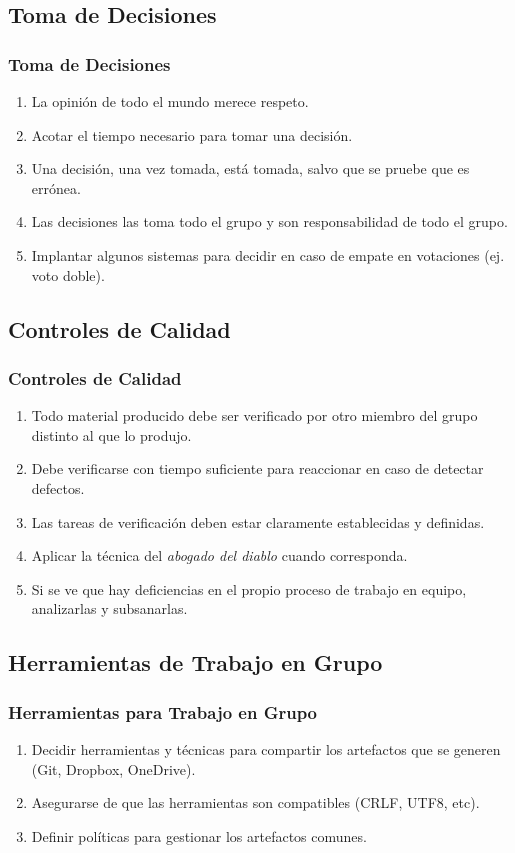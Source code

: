 \documentclass[handout,a4paper,slidestop,xcolor=pst,dvips,blue]{beamer}
\begin{document}
\subsection{Toma de Decisiones}

\begin{frame}[c]
	\frametitle{Toma de Decisiones}
	\begin{enumerate}[<+->]
		\item La opinión de todo el mundo merece respeto.
		\item Acotar el tiempo necesario para tomar una decisión.
		\item Una decisión, una vez tomada, está tomada, salvo que se pruebe que es errónea.
		\item Las decisiones las toma todo el grupo y son responsabilidad de todo el grupo.
		\item Implantar algunos sistemas para decidir en caso de empate en votaciones (ej. voto doble).
	\end{enumerate}
\end{frame}

\subsection{Controles de Calidad}

\begin{frame}[c]
	\frametitle{Controles de Calidad}
	\begin{enumerate}[<+->]
		\item Todo material producido debe ser verificado por otro miembro del grupo distinto al que lo produjo.
		\item Debe verificarse con tiempo suficiente para reaccionar en caso de detectar defectos.
		\item Las tareas de verificación deben estar claramente establecidas y definidas.
		\item Aplicar la técnica del \emph{abogado del diablo} cuando corresponda.
		\item Si se ve que hay deficiencias en el propio proceso de trabajo en equipo, analizarlas y subsanarlas.
	\end{enumerate}
\end{frame}

\subsection{Herramientas de Trabajo en Grupo}

\begin{frame}[c]
	\frametitle{Herramientas para Trabajo en Grupo}
	\begin{enumerate}[<+->]
		\item Decidir herramientas y técnicas para compartir los artefactos que se generen (Git, Dropbox, OneDrive).
		\item Asegurarse de que las herramientas son compatibles (CRLF, UTF8, etc).
		\item Definir políticas para gestionar los artefactos comunes.
	\end{enumerate}
\end{frame}
\end{document}
